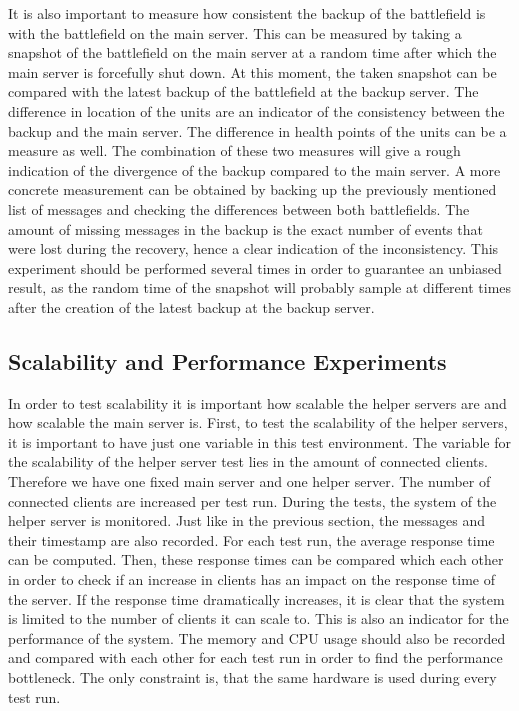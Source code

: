 It is also important to measure how consistent the backup of the battlefield is with the battlefield on the main server.
This can be measured by taking a snapshot of the battlefield on the main server at a random time after which the main server is forcefully shut down. 
At this moment, the taken snapshot can be compared with the latest backup of the battlefield at the backup server. 
The difference in location of the units are an indicator of the consistency between the backup and the main server. The difference in health points of the units can be a measure as well. The combination of these two measures will give a rough indication of the divergence of the backup compared to the main server. 
A more concrete measurement can be obtained by backing up the previously mentioned list of messages and checking the differences between both battlefields. The amount of missing messages in the backup is the exact number of events that were lost during the recovery, hence a clear indication of the inconsistency. 
This experiment should be performed several times in order to guarantee an unbiased result, as the random time of the snapshot will probably sample at different times after the creation of the latest backup at the backup server. 

\subsection{Scalability and Performance Experiments}
In order to test scalability it is important how scalable the helper servers are and how scalable the main server is. 
First, to test the scalability of the helper servers, it is important to have just one variable in this test environment. 
The variable for the scalability of the helper server test lies in the amount of connected clients. 
Therefore we have one fixed main server and one helper server.
The number of connected clients are increased per test run. 
During the tests, the system of the helper server is monitored.
Just like in the previous section, the messages and their timestamp are also recorded.
For each test run, the average response time can be computed.
Then, these response times can be compared which each other in order to check if an increase in clients has an impact on the response time of the server.
If the response time dramatically increases, it is clear that the system is limited to the number of clients it can scale to. 
This is also an indicator for the performance of the system.
The memory and CPU usage should also be recorded  and compared with each other for each test run in order to find the performance bottleneck. 
The only constraint is, that the same hardware is used during every test run.

